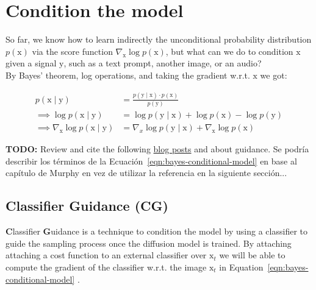     
\section{Condition the model}

So far, we know how to learn indirectly the unconditional probability distribution $p(\mathrm{x})$ via the score function $\nabla_{\mathrm{x}}\log p(\mathrm{x})$, but what can we do to condition $\mathrm{x}$ given a signal $\mathrm{y}$, such as a text prompt, another image, or an audio?\\

\noindent By Bayes' theorem, log operations, and taking the gradient w.r.t. $\mathrm{x}$ we got:

\begin{equation}\label{eqn:bayes-conditional-model}
    \begin{split}
        p(\mathrm{x} \mid \mathrm{y}) &= \frac{p(\mathrm{y} \mid \mathrm{x}) \cdot p(\mathrm{x})}{p(\mathrm{y})}\\
        \implies \log p(\mathrm{x} \mid \mathrm{y}) &= \log p(\mathrm{y} \mid \mathrm{x}) + \log p(\mathrm{x}) - \log p(\mathrm{y}) \\
        \implies \nabla_\mathrm{x} \log p(\mathrm{x} \mid \mathrm{y}) &= \nabla_x \log p(\mathrm{y} \mid \mathrm{x}) + \nabla_\mathrm{x} \log p(\mathrm{x})
    \end{split}
\end{equation}
    
\noindent \textbf{TODO:} Review and cite the following \href{https://sander.ai/2023/08/28/geometry.html}{blog posts} \cite{dieleman2022guidance} and \cite{dieleman2023geometry} about guidance. Se podría describir los términos de la
Ecuación~\ref{eqn:bayes-conditional-model} en base al capítulo de Murphy en
vez de utilizar la referencia en la siguiente sección...


\subsection{Classifier Guidance (CG)}\label{sec:clip-cg}

\textbf{C}lassifier \textbf{G}uidance is a technique to condition the model by using a classifier to guide the sampling process once the diffusion model is trained. By attaching attaching a cost function to an external classifier over $\mathrm{x}_{t}$ \cite{sohldickstein2015deep, song2021scorebased, Dhariwal2021DiffusionMB} we will be able to compute the gradient of the classifier w.r.t. the image $\mathrm{x}_{t}$ in Equation~\ref{eqn:bayes-conditional-model} \cite{dieleman2022guidance}.

